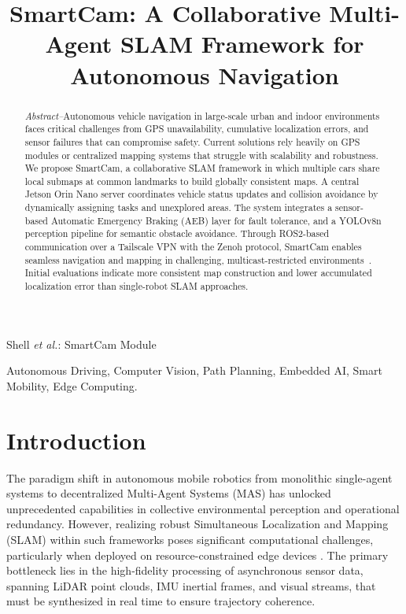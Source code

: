 \documentclass[journal,transmag]{IEEEtran}
\begin{document}
\title{
  \textbf{SmartCam: A Collaborative Multi-Agent SLAM Framework for Autonomous Navigation}
}

\author{
}

{Shell \MakeLowercase{\textit{et al.}}: SmartCam Module}

\maketitle

\begin{abstract}
\textit{Abstract--}Autonomous vehicle navigation in large-scale urban and indoor environments faces critical challenges from GPS unavailability, cumulative localization errors, and sensor failures that can compromise safety. Current solutions rely heavily on GPS modules or centralized mapping systems that struggle with scalability and robustness. We propose SmartCam, a collaborative SLAM framework in which multiple cars share local submaps at common landmarks to build globally consistent maps. A central Jetson Orin Nano server coordinates vehicle status updates and collision avoidance by dynamically assigning tasks and unexplored areas. The system integrates a sensor-based Automatic Emergency Braking (AEB) layer for fault tolerance, and a YOLOv8n perception pipeline for semantic obstacle avoidance. Through ROS2-based communication over a Tailscale VPN with the Zenoh protocol, SmartCam enables seamless navigation and mapping in challenging, multicast-restricted environments~\cite{Quigley2009}. Initial evaluations indicate more consistent map construction and lower accumulated localization error than single-robot SLAM approaches.
\end{abstract}

\begin{IEEEkeywords}
Autonomous Driving, Computer Vision, Path Planning, Embedded AI, Smart Mobility, Edge Computing.
\end{IEEEkeywords}

\section{Introduction}
The paradigm shift in autonomous mobile robotics from monolithic single-agent systems to decentralized Multi-Agent Systems (MAS) has unlocked unprecedented capabilities in collective environmental perception and operational redundancy. However, realizing robust Simultaneous Localization and Mapping (SLAM) within such frameworks poses significant computational challenges, particularly when deployed on resource-constrained edge devices \cite{Cadena2016}. The primary bottleneck lies in the high-fidelity processing of asynchronous sensor data, spanning LiDAR point clouds, IMU inertial frames, and visual streams, that must be synthesized in real time to ensure trajectory coherence.
\end{document}
